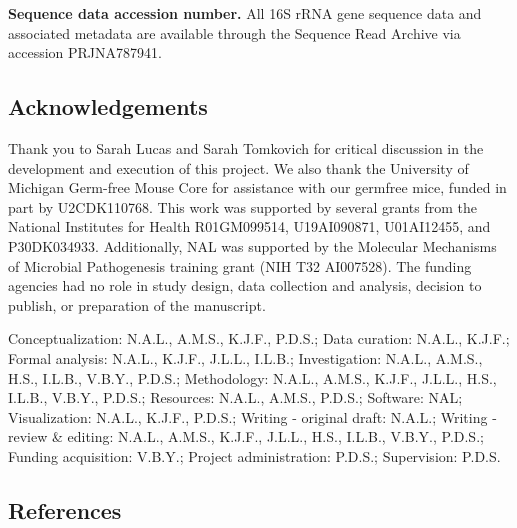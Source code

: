 \documentclass[
  12pt,
]{article}
\begin{document}
\textbf{Sequence data accession number.} All 16S rRNA gene sequence data
and associated metadata are available through the Sequence Read Archive
via accession PRJNA787941.

\hypertarget{acknowledgements}{%
\subsection{Acknowledgements}\label{acknowledgements}}

Thank you to Sarah Lucas and Sarah Tomkovich for critical discussion in
the development and execution of this project. We also thank the
University of Michigan Germ-free Mouse Core for assistance with our
germfree mice, funded in part by U2CDK110768. This work was supported by
several grants from the National Institutes for Health R01GM099514,
U19AI090871, U01AI12455, and P30DK034933. Additionally, NAL was
supported by the Molecular Mechanisms of Microbial Pathogenesis training
grant (NIH T32 AI007528). The funding agencies had no role in study
design, data collection and analysis, decision to publish, or
preparation of the manuscript.

Conceptualization: N.A.L., A.M.S., K.J.F., P.D.S.; Data curation:
N.A.L., K.J.F.; Formal analysis: N.A.L., K.J.F., J.L.L., I.L.B.;
Investigation: N.A.L., A.M.S., H.S., I.L.B., V.B.Y., P.D.S.;
Methodology: N.A.L., A.M.S., K.J.F., J.L.L., H.S., I.L.B., V.B.Y.,
P.D.S.; Resources: N.A.L., A.M.S., P.D.S.; Software: NAL; Visualization:
N.A.L., K.J.F., P.D.S.; Writing - original draft: N.A.L.; Writing -
review \& editing: N.A.L., A.M.S., K.J.F., J.L.L., H.S., I.L.B., V.B.Y.,
P.D.S.; Funding acquisition: V.B.Y.; Project administration: P.D.S.;
Supervision: P.D.S. \newpage

\hypertarget{references}{%
\subsection{References}\label{references}}
\end{document}
